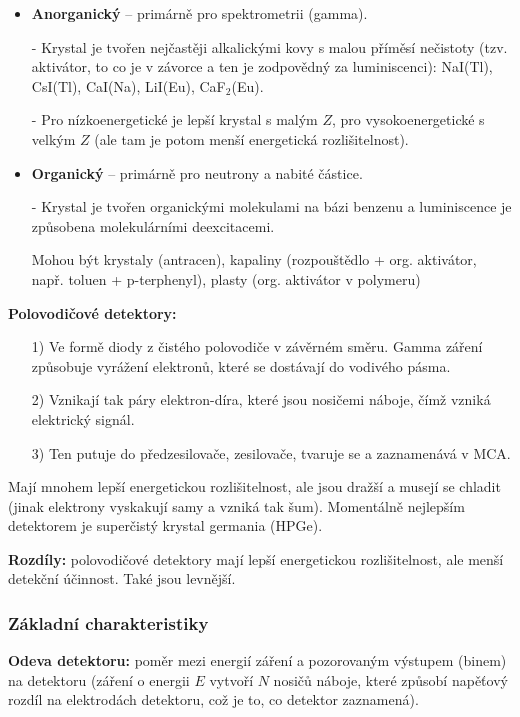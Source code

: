 \begin{itemize}
    \item \textbf{Anorganický} -- primárně pro spektrometrii (gamma). 
    \item[-] Krystal je tvořen nejčastěji alkalickými kovy s malou příměsí nečistoty (tzv. aktivátor, to co je v závorce a ten je zodpovědný za luminiscenci): NaI(Tl), CsI(Tl), CaI(Na), LiI(Eu), CaF$_2$(Eu). 
    \item[-] Pro nízkoenergetické je lepší krystal s malým $Z$, pro vysokoenergetické s velkým $Z$ (ale tam je potom menší energetická rozlišitelnost).  
    \item \textbf{Organický} -- primárně pro neutrony a nabité částice.
    \item[-] Krystal je tvořen organickými molekulami na bázi benzenu a luminiscence je způsobena molekulárními deexcitacemi.
    \item[] Mohou být krystaly (antracen), kapaliny (rozpouštědlo + org. aktivátor, např. toluen + p-terphenyl), plasty (org. aktivátor v polymeru)
\end{itemize}

\textbf{Polovodičové detektory:}

\begin{itemize}
    \item[1)] Ve formě diody z čistého polovodiče v závěrném směru. Gamma záření způsobuje vyrážení elektronů, které se dostávají do vodivého pásma.
    \item[2)] Vznikají tak páry elektron-díra, které jsou nosičemi náboje, čímž vzniká elektrický signál.
    \item[3)] Ten putuje do předzesilovače, zesilovače, tvaruje se a zaznamenává v MCA.
\end{itemize}

Mají mnohem lepší energetickou rozlišitelnost, ale jsou dražší a musejí se chladit (jinak elektrony vyskakují samy a vzniká tak šum). Momentálně nejlepším detektorem je superčistý krystal germania (HPGe).

\textbf{Rozdíly:} polovodičové detektory mají lepší energetickou rozlišitelnost, ale menší detekční účinnost. Také jsou levnější.

\subsubsection{Základní charakteristiky}

\textbf{Odeva detektoru:} poměr mezi energií záření a pozorovaným výstupem (binem) na detektoru (záření o energii $E$ vytvoří $N$ nosičů náboje, které způsobí napěťový rozdíl na elektrodách detektoru, což je to, co detektor zaznamená).

